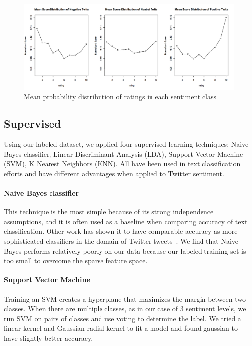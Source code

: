 \begin{figure}[htb]
\begin{center}
  \includegraphics[width=0.9\linewidth]{figs/meanIMDB.png}
\begin{minipage}{0.9\linewidth}
\end{minipage}
\end{center}
\caption{Mean probability distribution of ratings in each sentiment
    class}
\label{fig:imdb-mean}
\end{figure}


\subsection{Supervised}

Using our labeled dataset, we applied four supervised learning
techniques: Naive Bayes classifier, Linear Discriminant Analysis
(LDA), Support Vector Machine (SVM), K Nearest Neighbors (KNN). All
have been used in text classification efforts and have different
advantages when applied to Twitter sentiment.

\paragraph{Naive Bayes classifier}

This technique is the most simple because of its strong independence
assumptions, and it is often used as a baseline when comparing
accuracy of text classification. Other work has shown it to have
comparable accuracy as more sophisticated classifiers in the domain of
Twitter tweets~\cite{Pak:2010}. We find that Naive Bayes performs
relatively poorly on our data because our labeled training set is too small to
overcome the sparse feature space.

\paragraph{Support Vector Machine}

Training an SVM creates a hyperplane that maximizes the margin between
two classes. When there are multiple classes, as in our case of 3
sentiment levels, we run SVM on pairs of classes and use voting to
determine the label. We tried a linear kernel and Gaussian radial
kernel to fit a model and found gaussian to have slightly better
accuracy.

